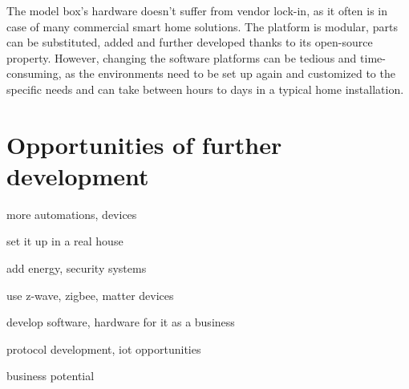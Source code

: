 The model box's hardware doesn't suffer from vendor lock-in, as it often is in case of many commercial smart home solutions. The platform is modular, parts can be substituted, added and further developed thanks to its open-source property. However, changing the software platforms can be tedious and time-consuming, as the environments need to be set up again and customized to the specific needs and can take between hours to days in a typical home installation.

\section{Opportunities of further development}

more automations, devices

set it up in a real house

add energy, security systems

use z-wave, zigbee, matter devices

develop software, hardware for it as a business

protocol development, iot opportunities

business potential
